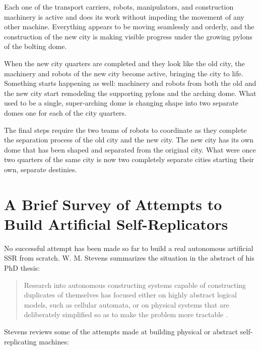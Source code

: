 Each one of the transport carriers, robots, manipulators, and
construction machinery is active and does its work without impeding the
movement of any other machine. Everything appears to be moving
seamlessly and orderly, and the construction of the new city is making
visible progress under the growing pylons of the bolting dome.

When the new city quarters are completed and they look
like the old city, the machinery and
robots of the new city become active, bringing the city to life. Something starts happening
as well: machinery and robots from both the old and the new city start
remodeling the supporting pylons and the arching dome.  
What used to be a single, super-arching dome is changing shape into two
separate domes one for each of the city quarters.

The final steps require the two teams of robots to coordinate as they complete the separation process of the old city and the new city. The new city has its own dome that has been shaped and separated from the original city. What were once two quarters of the same city is now two completely separate cities starting their own, separate destinies.

\section[Attempts to Build Artificial Self-Replicators]{A Brief Survey of Attempts to Build Artificial Self-Replicators}

No successful attempt has been made so far to build a real
autonomous artificial SSR from scratch. W. M. Stevens summarizes the
situation in the abstract of his PhD thesis:

\begin{quote}
Research into autonomous constructing systems capable of constructing
duplicates of themselves has focused either on highly abstract logical models, such as
cellular automata, or on physical systems that are deliberately simplified so as to make
the problem more tractable \citep{stevens2009}.
\end{quote}

Stevens reviews some of the attempts made at building physical or
abstract self-replicating machines:

